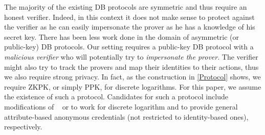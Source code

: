 The majority of the existing \ac{DB} protocols are symmetric and thus require an honest verifier.
Indeed, in this context it does not make sense to protect against the verifier as he can easily impersonate the prover as he has a knowledge of his secret key.
There has been less work done in the domain of asymmetric (or public-key) \ac{DB} protocols.
Our setting requires a public-key \ac{DB} protocol with a \emph{malicious verifier} who will potentially try to \emph{impersonate the prover}.
The verifier might also try to track the provers and map their identities to 
their actions, thus we also require strong privacy.
In fact, as the construction in \cref{Protocol} shows, we require  
\ac{ZKPK}, or simply \ac{PPK}, for discrete logarithms.
For this paper, we assume the existence of such a protocol. Candidates for such a protocol include modifications of ~\cite{ProProx} or \cite{PROPS} to work for discrete logarithm and to provide general attribute-based anonymous credentials (not restricted to identity-based ones), respectively.

